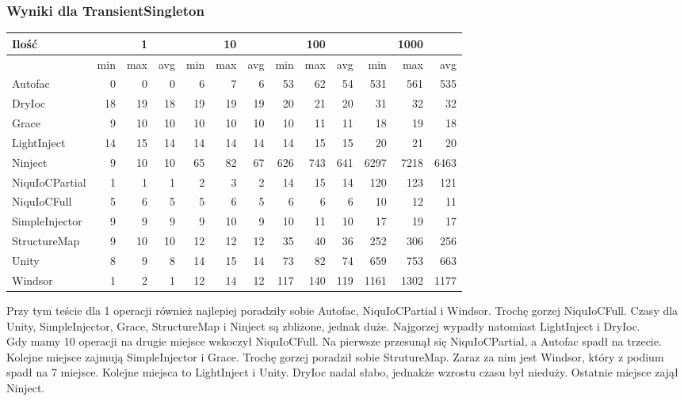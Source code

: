 \documentclass[12pt]{article}
\begin{document}
\subsubsection{Wyniki dla TransientSingleton}
\begin{center}
\begin{small}
	\begin{tabular}{ | l | r r r | r r r | r r r | r r r | }
    		\hline
Ilość & & 1 & & & 10 & & & 100 & & & 1000 & \\ \hline
 & min & max & avg & min & max & avg & min & max & avg & min & max & avg \\ \hline
Autofac & 0 & 0 & 0 & 6 & 7 & 6 & 53 & 62 & 54 & 531 & 561 & 535 \\ \hline
DryIoc & 18 & 19 & 18 & 19 & 19 & 19 & 20 & 21 & 20 & 31 & 32 & 32 \\ \hline
Grace & 9 & 10 & 10 & 10 & 10 & 10 & 10 & 11 & 11 & 18 & 19 & 18 \\ \hline
LightInject & 14 & 15 & 14 & 14 & 14 & 14 & 14 & 15 & 15 & 20 & 21 & 20 \\ \hline
Ninject & 9 & 10 & 10 & 65 & 82 & 67 & 626 & 743 & 641 & 6297 & 7218 & 6463 \\ \hline
NiquIoCPartial & 1 & 1 & 1 & 2 & 3 & 2 & 14 & 15 & 14 & 120 & 123 & 121 \\ \hline
NiquIoCFull & 5 & 6 & 5 & 5 & 6 & 5 & 6 & 6 & 6 & 10 & 12 & 11 \\ \hline
SimpleInjector & 9 & 9 & 9 & 9 & 10 & 9 & 10 & 11 & 10 & 17 & 19 & 17 \\ \hline
StructureMap & 9 & 10 & 10 & 12 & 12 & 12 & 35 & 40 & 36 & 252 & 306 & 256 \\ \hline
Unity & 8 & 9 & 8 & 14 & 15 & 14 & 73 & 82 & 74 & 659 & 753 & 663 \\ \hline
Windsor & 1 & 2 & 1 & 12 & 14 & 12 & 117 & 140 & 119 & 1161 & 1302 & 1177 \\ \hline
  	\end{tabular}
\end{small}
\end{center}
Przy tym teście dla 1 operacji również najlepiej poradziły sobie Autofac, NiquIoCPartial i Windsor. Trochę gorzej NiquIoCFull. Czasy dla Unity, SimpleInjector, Grace, StructureMap i Ninject są zbliżone, jednak duże. Najgorzej wypadły natomiast LightInject i DryIoc.\\
Gdy mamy 10 operacji na drugie miejsce wskoczył NiquIoCFull. Na pierwsze przesunął się NiquIoCPartial, a Autofac spadł na trzecie. Kolejne miejsce zajmują SimpleInjector i Grace. Trochę gorzej poradził sobie StrutureMap. Zaraz za nim jest Windsor, który z podium spadł na 7 miejsce. Kolejne miejsca to LightInject i Unity. DryIoc nadal słabo, jednakże wzrostu czasu był nieduży. Ostatnie miejsce zajął Ninject.\\
\end{document}
